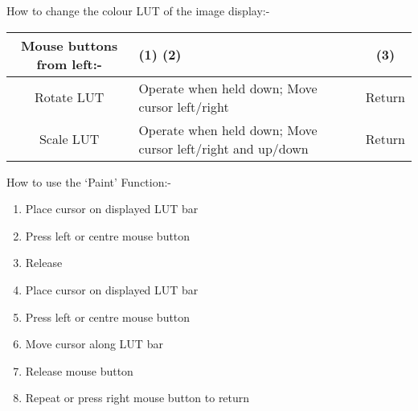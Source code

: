 \begin{small}
{{ How to change the colour LUT of the image display:-

\hspace*{4ex}\begin{tabular}{|c|p{3.5in}|c|} \hline
      Mouse buttons from left:- &   (1)   \hspace*{4ex} (2)   & (3) \\ \hline
       Rotate LUT    & Operate when held down; Move cursor left/right &
                        Return \\ \hline
       Scale  LUT    & Operate when held down;  Move cursor left/right
                        and up/down & Return \\
 \hline\end{tabular}

How to use the `Paint' Function:-

\begin{enumerate}
  \item              Place cursor on displayed LUT bar
  \item                Press left or centre mouse button
  \item                Release
  \item                Place cursor on displayed LUT bar
  \item                Press left or centre mouse button
  \item                Move cursor along LUT bar
  \item                Release mouse button
  \item                Repeat or press right mouse button to return
\end{enumerate}



}}
\end{small}
